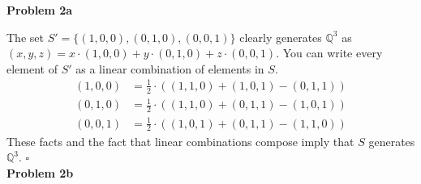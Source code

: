 \documentclass{article}
\newcommand{\problem}[1]{\large\textbf{Problem #1}\normalsize}
\newcommand{\qed}{\hfill\ensuremath{\square}}
\begin{document}
\problem{2a}

The set $S' = \{ (1, 0, 0), (0, 1, 0), (0, 0, 1) \}$ clearly generates
$\mathbb{Q}^3$ as $(x, y, z) = x\cdot(1, 0, 0) + y\cdot(0, 1, 0) + z\cdot(0, 0,
1)$. You can write every element of $S'$ as a linear combination of elements in
$S$. 
\begin{align*}
  (1, 0, 0) &= \frac{1}{2}\cdot((1, 1, 0) + (1, 0, 1) - (0, 1, 1)) \\
  (0, 1, 0) &= \frac{1}{2}\cdot((1, 1, 0) + (0, 1, 1) - (1, 0, 1)) \\
  (0, 0, 1) &= \frac{1}{2}\cdot((1, 0, 1) + (0, 1, 1) - (1, 1, 0)) 
\end{align*}
These facts and the fact that linear combinations compose imply that $S$ generates $\mathbb{Q}^3$. \qed \\

\problem{2b}
\end{document}
